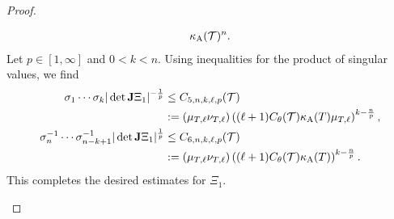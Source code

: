 \documentclass[10pt,a4paper]{article}
\begin{document}
\begin{proof}
\begin{itemize}
\begin{align*}
            \kappa_{\rm A}({\mathcal T})^{n}
            .
        \end{align*}
        \color{blue}
        Let $p \in [1,\infty]$ and $0 < k < n$. Using inequalities for the product of singular values, we find 
        \begin{align*}
            \sigma_{1}\cdots\sigma_{k} | \det{\mathbf{J}}\Xi_{1} |^{-\frac 1 p}
            &
            \leq 
            C_{5,n,k,\ell,p}({\mathcal T})
            \\&
            :=
            \left( 
            \mu_{T,\ell} 
            \nu_{T,\ell}
            \right)
            \left( (\ell+1) C_\theta({\mathcal T}) \kappa_{\rm A}(T)\mu_{T,\ell} \right)^{k-\frac n p}
            ,
            \\
            \sigma_{n}^{-1}\cdots\sigma_{n-k+1}^{-1} | \det{\mathbf{J}}\Xi_{1} |^{\frac 1 p}
            &
            \leq 
            C_{6,n,k,\ell,p}({\mathcal T})
            \\&
            :=
            \left(
            \mu_{T,\ell} 
            \nu_{T,\ell}
            \right)
            \left( (\ell+1) C_\theta({\mathcal T}) \kappa_{\rm A}(T) \right)^{k-\frac n p}            
            .
        \end{align*}
        This completes the desired estimates for $\Xi_{1}$. 
        \color{black}
        

\end{itemize}
\end{proof}
\end{document}
